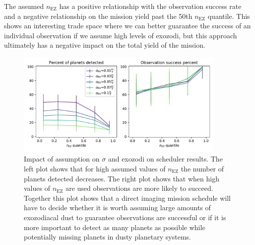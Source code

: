 The assumed $n_\textrm{EZ}$ has a positive relationship with the observation
success rate and a negative relationship on the mission yield past the 50th
$n_\textrm{EZ}$ quantile. This shows an interesting trade space where we can
better guarantee the success of an individual observation if we assume high
levels of exozodi, but this approach ultimately has a negative impact on the
total yield of the mission.

\begin{figure}
  \begin{center}
    \includegraphics[width=0.9\textwidth]{ch4/figures/succes_rate_vs_percent_detected.pdf}
  \end{center}
  \caption{
    Impact of assumption on $\sigma$ and exozodi on scheduler results. The left plot shows
    that for high assumed values of $n_\textrm{EZ}$ the number of planets detected decreases.
    The right plot shows that when high values of $n_\textrm{EZ}$ are used observations are
    more likely to succeed. Together this plot shows that a direct imaging mission schedule
    will have to decide whether it is worth assuming large amounts of exozodiacal dust
    to guarantee observations are successful or if it is more important to detect as many
    planets as possible while potentially missing planets in dusty planetary systems.
  }
  \label{fig:sigma_nEZ_impact_plots}
\end{figure}

